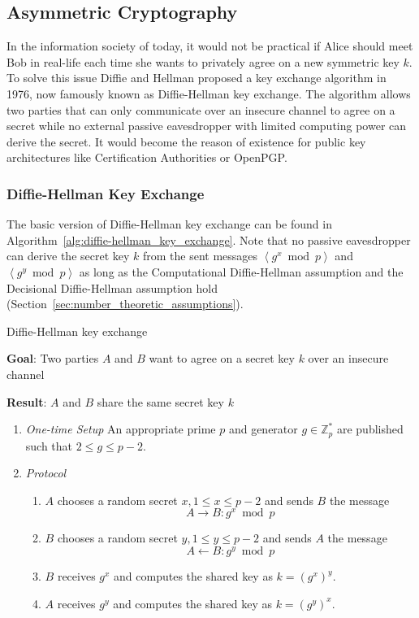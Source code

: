 \subsection{Asymmetric Cryptography}
In the information society of today, it would not be practical if Alice should meet Bob in real-life each time she wants to privately agree on a new symmetric key $k$. To solve this issue Diffie and Hellman proposed a key exchange algorithm in 1976, now famously known as Diffie-Hellman key exchange. The algorithm allows two parties that can only communicate over an insecure channel to agree on a secret while no external passive eavesdropper with limited computing power can derive the secret. It would become the reason of existence for public key architectures like Certification Authorities or OpenPGP.

\subsubsection{Diffie-Hellman Key Exchange}
The basic version of Diffie-Hellman key exchange can be found in Algorithm~\ref{alg:diffie-hellman_key_exchange}. Note that no passive eavesdropper can derive the secret key $k$ from the sent messages $\left< g^x \bmod p \right>$ and $\left< g^y \bmod p \right>$ as long as the Computational Diffie-Hellman assumption and the Decisional Diffie-Hellman assumption hold (Section~\ref{sec:number_theoretic_assumptions}).

\begin{algorithm}
\caption{Diffie-Hellman key exchange~\cite{book:handbook_of_applied_cryptography} }
\label{alg:diffie-hellman_key_exchange}
 \textbf{Goal}: Two parties $A$ and $B$ want to agree on a secret key $k$ over an insecure channel
 
 \textbf{Result}: $A$ and $B$ share the same secret key $k$
 \begin{enumerate}
  \item \textit{One-time Setup} An appropriate prime $p$ and generator $g \in \mathbb{Z}^*_p$ are published such that $2 \leq g \leq p-2$.
  \item \textit{Protocol}
  \begin{enumerate}
   \item $A$ chooses a random secret $x, 1 \leq x \leq p-2$ and sends $B$ the message
   \begin{equation*}
    A \rightarrow B: g^x \bmod p
   \end{equation*}
   \item $B$ chooses a random secret $y, 1 \leq y \leq p-2$ and sends $A$ the message
   \begin{equation*}
    A \leftarrow B: g^y \bmod p
   \end{equation*}
   \item $B$ receives $g^x$ and computes the shared key as $k = \left( g^x \right)^y$.
   \item $A$ receives $g^y$ and computes the shared key as $k = \left( g^y \right)^x$.
  \end{enumerate}

 \end{enumerate}
\end{algorithm}


